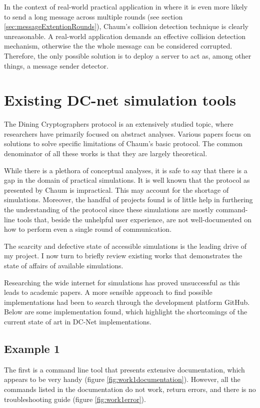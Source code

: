 In the context of real-world practical application in where it is even more likely to send a long message across multiple rounds (see section \ref{sec:messageExtentionRounds}), Chaum's collision detection technique is clearly unreasonable. 
A real-world application demands an effective collision detection mechanism, otherwise the the whole message can be considered corrupted. Therefore, the only possible solution is to deploy a server to act as, among other things, a message sender detector.


\section{Existing DC-net simulation tools} \label{sec:similarWorks}

The Dining Cryptographers protocol is an extensively studied topic, where researchers have primarily focused on abstract analyses. Various papers focus on solutions to solve specific limitations of Chaum's basic protocol. The common denominator of all these works is that they are largely theoretical. 

While there is a plethora of conceptual analyses, it is safe to say that there is a gap in the domain of practical simulations. It is well known that the protocol as presented by Chaum is impractical. This may account for the shortage of simulations. Moreover, the handful of projects found is of little help in furthering the understanding of the protocol since these simulations are mostly command-line tools that, beside the unhelpful user experience, are not well-documented on how to perform even a single round of communication.

The scarcity and defective state of accessible simulations is the leading drive of my project. I now turn to briefly review existing works that demonstrates the state of affairs of available simulations. \newline

Researching the wide internet for simulations has proved unsuccessful as this leads to academic papers. A more sensible approach to find possible implementations had been to search through the development platform GitHub. Below are some implementation found, which highlight the shortcomings of the current state of art in DC-Net implementations.

\subsection{Example 1}
The first is a command line tool that presents extensive documentation, which appears to be very handy (figure \ref{fig:work1documentation}). However, all the commands listed in the documentation do not work, return errors, and there is no troubleshooting guide (figure \ref{fig:work1error}).

